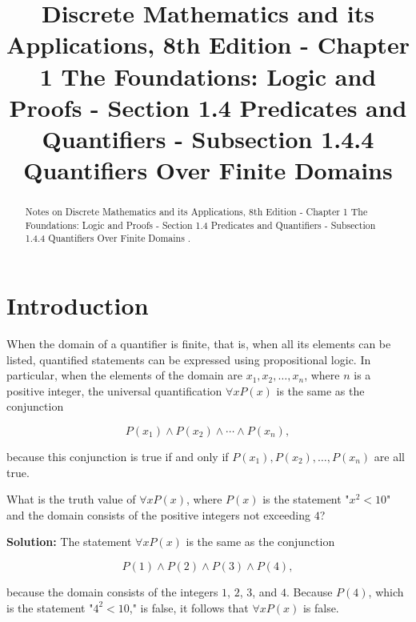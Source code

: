 \documentclass{Axon}
\title{Discrete Mathematics and its Applications, 8th Edition - Chapter 1 The Foundations: Logic and Proofs - Section 1.4 Predicates and Quantifiers - Subsection 1.4.4 Quantifiers Over Finite Domains}
\begin{document}
\maketitle
\makeauthor
\begin{abstract}
Notes on Discrete Mathematics and its Applications, 8th Edition - Chapter 1 The Foundations: Logic and Proofs - Section 1.4 Predicates and Quantifiers - Subsection 1.4.4 Quantifiers Over Finite Domains \cite{Rosen}.
\end{abstract}
\section{Introduction}
When the domain of a quantifier is finite, that is, when all its elements can be listed, quantified statements can be expressed using propositional logic. In particular, when the elements of the domain are \(x_1, x_2, \ldots,x_n\), where \(n\) is a positive integer, the universal quantification \(\forall x P(x)\) is the same as the conjunction

\begin{equation*}
    P(x_1) \land P(x_2) \land \cdots \land P(x_n),
\end{equation*}

because this conjunction is true if and only if \(P(x_1), P(x_2), \ldots, P(x_n)\) are all true.

\begin{example}
    What is the truth value of \(\forall x P(x)\), where \(P(x)\) is the statement "\(x^2 < 10\)" and the domain consists of the positive integers not exceeding \(4\)?

    \noindent
    \textbf{Solution:}
    The statement \(\forall x P(x)\) is the same as the conjunction
    
    \begin{equation*}
        P(1) \land P(2) \land P(3) \land P(4),
    \end{equation*}

    because the domain consists of the integers \(1\), \(2\), \(3\), and \(4\). Because \(P(4)\), which is the statement "\(4^2 < 10\)," is false, it follows that \(\forall x P(x)\) is false.
\end{example}
\end{document}
